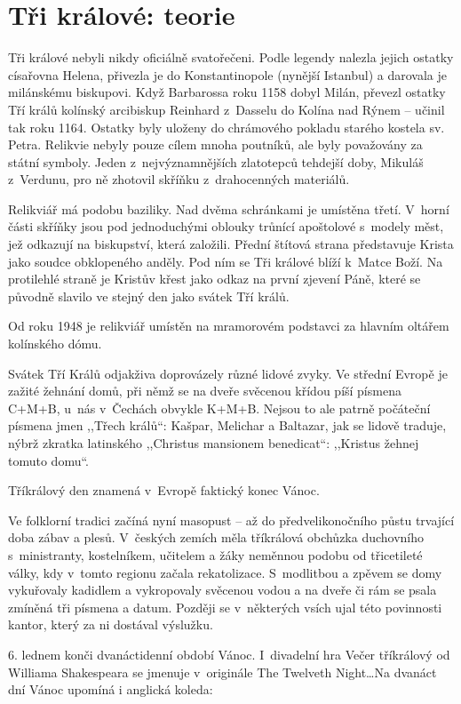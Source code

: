 \section{Tři králové: teorie}

\noindent
Tři králové nebyli nikdy oficiálně svatořečeni. Podle legendy nalezla jejich ostatky císařovna Helena, přivezla je do Konstantinopole (nynější Istanbul) a darovala je milánskému biskupovi. Když Barbarossa roku 1158 dobyl Milán, převezl ostatky Tří králů  kolínský arcibiskup Reinhard z Dasselu do Kolína nad Rýnem -- učinil tak roku 1164. Ostatky byly uloženy do chrámového pokladu starého kostela sv. Petra. Relikvie nebyly pouze cílem mnoha poutníků, ale byly považovány za státní symboly. Jeden z nejvýznamnějších zlatotepců tehdejší doby, Mikuláš z Verdunu, pro ně zhotovil skříňku z drahocenných materiálů.

Relikviář má podobu baziliky. Nad dvěma schránkami je umístě\-na třetí. V horní části skříňky jsou pod jednoduchými oblouky trůnící apoštolové s modely měst, jež odkazují na biskupství, která založili. Přední štítová strana představuje Krista jako soudce obklopeného anděly. Pod ním se Tři králové blíží k Matce Boží. Na protilehlé straně je Kristův křest jako odkaz na první zjevení Páně, které se původně slavilo ve stejný den jako svátek Tří králů.

Od roku 1948 je relikviář umístěn na mramorovém podstavci za hlavním oltářem kolínského dómu.

Svátek Tří Králů odjakživa doprovázely různé lidové zvyky. Ve střední Evropě je zažité žehnání domů, při němž se na dveře svěcenou křídou píší písmena C+M+B, u~nás v Čechách obvykle K+M+B. Nejsou to ale patrně počáteční písmena jmen ,,Třech králů``: Kašpar, Melichar a Baltazar, jak se lidově traduje, nýbrž zkratka latinského ,,Christus mansionem benedicat``: ,,Kristus žehnej tomuto domu``.

Tříkrálový den znamená v Evropě faktický konec Vánoc.

Ve folklorní tradici začíná nyní masopust -- až do předvelikonočního půstu trvající doba zábav a plesů. V českých zemích měla tříkrálová obchůzka duchovního s ministranty, kostelníkem, učitelem a žáky neměnnou podobu od třicetileté války, kdy v tomto regionu začala rekatolizace. S modlitbou a zpěvem se domy vykuřovaly kadidlem a vykropovaly svěcenou vodou a na dveře či rám se psala zmíněná tři písmena a datum. Později se v některých vsích ujal této povinnosti kantor, který za ni dostával výslužku.

6. lednem konči dvanáctidenní období Vánoc. I~divadelní hra Večer tříkrálový od Williama Shakespeara se jmenuje v originále The Twelveth Night\ldots Na dvanáct dní Vánoc upomíná i anglická koleda:


